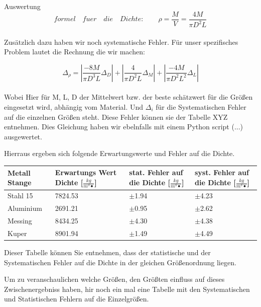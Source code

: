 \documentclass[twoside]{protokoll}
\begin{document}
\begin{aufgabe}{Auswertung}
\begin{equation}
	formel\quad fuer \quad die \quad Dichte: \qquad \rho = \frac{M}{V} = \frac{4M}{\pi D^2L}
\end{equation}\\

Zusätzlich dazu haben wir noch systematische Fehler. Für unser spezifisches Problem lautet die Rechnung die wir machen:

\begin{equation}
	\Delta_{\rho} = \left|\frac{-8M}{\pi D^3L}\Delta_D\right| + 
	\left|\frac{4}{\pi D^2L}\Delta_M\right| + 
	\left|\frac{-4M}{\pi D^2L^2}\Delta_L\right|
\end{equation}\\

Wobei Hier für M, L, D der Mittelwert bzw. der beste schätzwert für die Größen eingesetzt wird, abhängig 
vom Material. Und $\Delta_i$ für die Systematischen Fehler auf die einzelnen Größen steht. 
Diese Fehler können sie der Tabelle XYZ entnehmen. 
Dies Gleichung haben wir ebelnfalls mit einem Python script (...)
ausgewertet.

Hierraus ergeben sich folgende Erwartungswerte und Fehler auf die Dichte. 


 \begin{table}[H]
        \centering
        \begin{tabularx}{1\textwidth}{X X X X} %
            \toprule
            \textbf{Metall Stange} & \textbf{Erwartungs Wert Dichte [$\frac{kg}{m^3•}$]} & \textbf{stat. Fehler auf die Dichte [$\frac{kg}{m^3•}$]} & \textbf{syst. Fehler auf die Dichte [$\frac{kg}{m^3•}$]}\\
            \midrule
            Stahl 15 & 7824.53 & $\pm$1.94 & $\pm$4.23 \\
            Aluminium & 2691.21 & $\pm$0.95 & $\pm$2.62 \\
            Messing & 8434.25 & $\pm$4.30 & $\pm$4.38 \\
            Kuper & 8901.94 & $\pm$1.49 & $\pm$4.49\\
            \bottomrule
        \end{tabularx}
        \label{tab:mytable}
    \end{table}

Dieser Tabelle können Sie entnehmen, dass der statistische und der Systematischen Fehler auf die Dichte in der gleichen Größenordnung liegen. 

Um zu veranschaulichen welche Größen, den Größten einfluss auf dieses Zwischenergebniss haben, hir noch ein mal eine Tabelle mit den Systematischen 
und Statistischen Fehlern auf die Einzelgrößen. 


\end{aufgabe}
\end{document}
